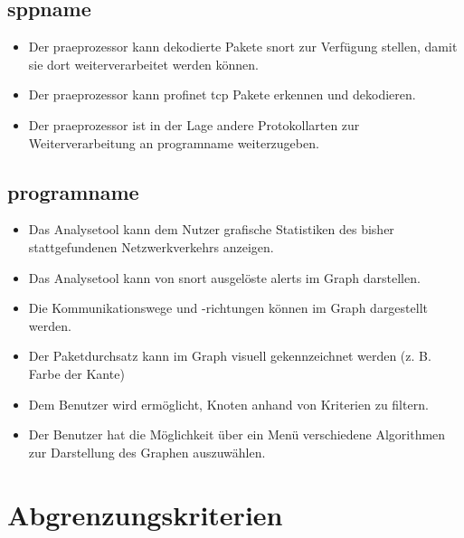 \subsection{\gls{sppname}}

\begin{itemize}

\item Der \gls{praeprozessor} kann dekodierte Pakete \gls{snort} zur Verfügung stellen, damit sie dort weiterverarbeitet werden können.

\item Der \gls{praeprozessor} kann \gls{profinet} \gls{tcp} Pakete erkennen und dekodieren.

\item Der \gls{praeprozessor} ist in der Lage andere Protokollarten zur Weiterverarbeitung an \gls{programname} weiterzugeben.
\end{itemize}

\subsection{\gls{programname}}

\begin{itemize}
\item Das Analysetool kann dem Nutzer grafische Statistiken des bisher stattgefundenen Netzwerkverkehrs anzeigen.

\item Das Analysetool kann von \gls{snort} ausgelöste \glspl{alert} im Graph darstellen.

\item Die Kommunikationswege und -richtungen können im Graph dargestellt werden.

\item Der Paketdurchsatz kann im Graph visuell gekennzeichnet werden (z. B. Farbe der Kante)

\item Dem Benutzer wird ermöglicht, Knoten anhand von Kriterien zu filtern.

\item Der Benutzer hat die Möglichkeit über ein Menü verschiedene Algorithmen zur Darstellung des Graphen auszuwählen.
\end{itemize}

\section{Abgrenzungskriterien}

